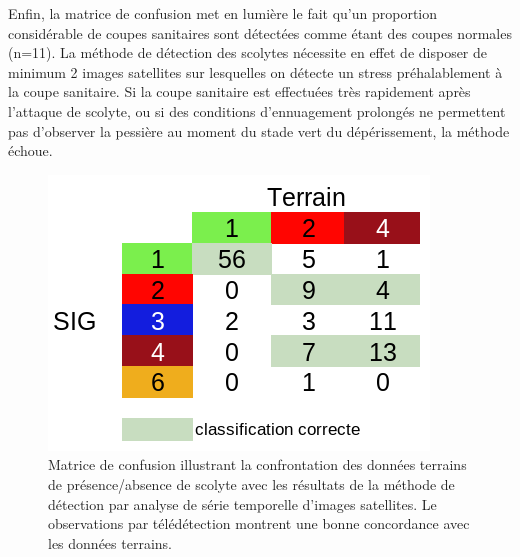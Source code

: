 \documentclass[a4paper, 12pt]{article} %
\begin{document}
Enfin, la matrice de confusion met en lumière le fait qu'un proportion considérable de coupes sanitaires sont détectées comme étant des coupes normales (n=11). La méthode de détection des scolytes nécessite en effet de disposer de minimum 2 images satellites sur lesquelles on détecte un stress préhalablement à la coupe sanitaire. Si la coupe sanitaire est effectuées très rapidement après l'attaque de scolyte, ou si des conditions d'ennuagement prolongés ne permettent pas d'observer la pessière au moment du stade vert du dépérissement, la méthode échoue.

\begin{figure}
	\centering
	\includegraphics[width=\linewidth]{confusionMat.png}
	\caption{Matrice de confusion illustrant la confrontation des données terrains de présence/absence de scolyte avec les résultats de la méthode de détection par analyse de série temporelle d'images satellites. Le observations par télédétection montrent une bonne concordance avec les données terrains.}
	\label{fig:tabConMat}
\end{figure}
\end{document}
